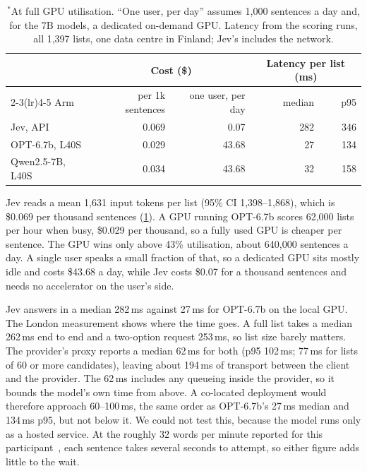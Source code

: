 \documentclass[11pt]{article}
\begin{document}
\begin{table}[t]
\centering\small
\begin{tabular}{lrrrr}
\toprule
& \multicolumn{2}{c}{Cost (\$)} & \multicolumn{2}{c}{Latency per list (ms)} \\
\cmidrule(lr){2-3}\cmidrule(lr){4-5}
Arm & per 1k sentences & one user, per day & median & p95 \\
\midrule
Jev, API & 0.069 & 0.07 & 282 & 346 \\
OPT-6.7b, L40S & 0.029\rlap{$^*$} & 43.68 & 27 & 134 \\
Qwen2.5-7B, L40S & 0.034\rlap{$^*$} & 43.68 & 32 & 158 \\
\bottomrule
\end{tabular}
\caption{$^*$At full GPU utilisation. ``One user, per day'' assumes 1,000 sentences a
day and, for the 7B models, a dedicated on-demand GPU. Latency from the scoring runs, all
1,397 lists, one data centre in Finland; Jev's includes the network.}
\label{tab:cost}
\end{table}

Jev reads a mean 1,631 input tokens per list (95\% CI 1,398--1,868), which is \$0.069 per
thousand sentences (\cref{tab:cost}). A GPU running OPT-6.7b scores 62,000 lists per hour
when busy, \$0.029 per thousand, so a fully used GPU is cheaper per sentence. The GPU wins
only above 43\% utilisation, about 640,000 sentences a day. A single user speaks a small
fraction of that, so a dedicated GPU sits mostly idle and costs \$43.68 a day, while Jev
costs \$0.07 for a thousand sentences and needs no accelerator on the user's side.

Jev answers in a median 282\,ms against 27\,ms for OPT-6.7b on the local GPU. The London
measurement shows where the time goes. A full list takes a median 262\,ms end to end and
a two-option request 253\,ms, so list size barely matters. The provider's proxy reports a
median 62\,ms for both (p95 102\,ms; 77\,ms for lists of 60 or more candidates), leaving
about 194\,ms of transport between the client and the provider. The 62\,ms includes any
queueing inside the provider, so it bounds the model's own time from above. A co-located
deployment would therefore approach 60--100\,ms, the same order as OPT-6.7b's 27\,ms
median and 134\,ms p95, but not below it. We could not test this, because the model runs
only as a hosted service. At the roughly 32 words per minute reported for this
participant~\cite{card2024}, each sentence takes several seconds to attempt, so either
figure adds little to the wait.
\end{document}

